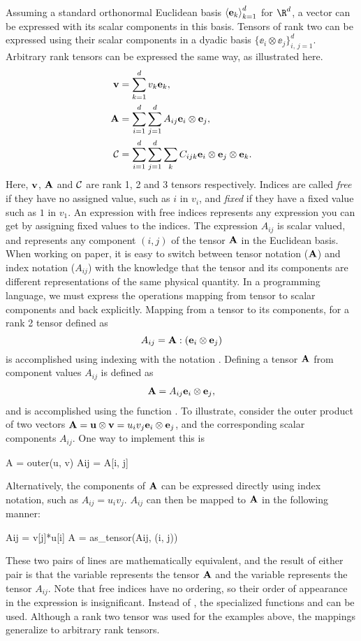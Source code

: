 Assuming a standard orthonormal Euclidean basis $\seq{\ee_k}_{k=1}^d$
for $\R^d$, a vector can be expressed with its scalar components in
this basis.  Tensors of rank two can be expressed using their scalar
components in a dyadic basis $\{ \ee_i\otimes\ee_j \}_{i,\,j=1}^d$.
Arbitrary rank tensors can be expressed the same way, as illustrated here.
\begin{align}
\vv &= \sum_{k=1}^{d} v_k \ee_k,
\\
\AA &= \sum_{i=1}^{d} \sum_{j=1}^{d} A_{ij} \ee_i \otimes \ee_j,
\\
\Cc &= \sum_{i=1}^{d} \sum_{j=1}^{d} \sum_k C_{ijk} \ee_i \otimes \ee_j \otimes \ee_k.
\end{align}
Here, $\vv$, $\AA$ and $\Cc$ are rank 1, 2 and 3 tensors respectively.
Indices are called \emph{free} if they have no assigned value, such as
$i$ in $v_i$, and \emph{fixed} if they have a fixed value such as $1$ in
$v_1$. An expression with free indices represents any expression you can
get by assigning fixed values to the indices.  The expression $A_{ij}$ is
scalar valued, and represents any component $(i,j)$ of the tensor $\AA$ in
the Euclidean basis.  When working on paper, it is easy to switch between
tensor notation ($\AA$) and index notation ($A_{ij}$) with the knowledge
that the tensor and its components are different representations of the
same physical quantity.  In a programming language, we must express the
operations mapping from tensor to scalar components and back explicitly.
Mapping from a tensor to its components, for a rank 2 tensor defined as
\begin{equation}
A_{ij} = \AA : (\ee_i\otimes\ee_j)
\end{equation}
is accomplished using indexing with the notation .  Defining a
tensor $\AA$ from component values $A_{ij}$ is defined as
\begin{align}
\AA = A_{ij} \ee_i\otimes\ee_j,
\end{align}
and is accomplished using the function .
To illustrate, consider the outer product of two vectors $\AA =
\uu\otimes\vv = u_i v_j \ee_i\otimes\ee_j$, and the corresponding scalar
components $A_{ij}$.  One way to implement this is
\begin{python}
A = outer(u, v)
Aij = A[i, j]
\end{python}
Alternatively, the components of $\AA$ can be expressed directly using
index notation, such as $A_{ij} = u_i v_j$.  $A_{ij}$ can then be mapped
to $\AA$ in the following manner:
\begin{python}
Aij = v[j]*u[i]
A = as_tensor(Aij, (i, j))
\end{python}
These two pairs of lines are mathematically equivalent, and the result
of either pair is that the variable  represents the tensor $\AA$
and the variable  represents the tensor $A_{ij}$.  Note that free
indices have no ordering, so their order of appearance in the expression
 is insignificant.  Instead of , the
specialized functions  and  can be used.
Although a rank two tensor was used for the examples above, the mappings
generalize to arbitrary rank tensors.

